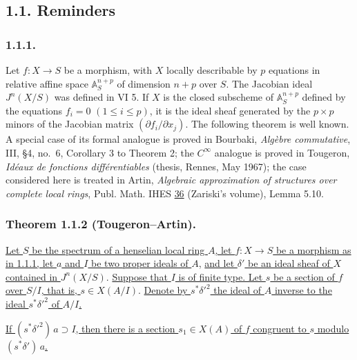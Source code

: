 \subsection*{1.1. Reminders}

\subsubsection*{1.1.1.}
Let $f:X\longrightarrow S$ be a morphism, with $X$ locally
describable by $p$ equations in relative affine space
$\mathbb A_S^{n+p}$ of dimension $n+p$ over $S$.  The Jacobian ideal
$J^n(X/S)$ was defined in VI 5.  If $X$ is the closed subscheme of
$\mathbb A_S^{n+p}$ defined by the equations
$f_i=0$ $(1\leq i\leq p)$, it is the ideal sheaf generated by the
$p\times p$ minors of the Jacobian matrix
$(\partial f_i/\partial x_j)$.  The following theorem is well known.
A special case of its formal analogue is proved in Bourbaki,
\emph{Alg\`ebre commutative}, III, \S4, no.~6, Corollary 3 to
Theorem 2; the $C^\infty$ analogue is proved in Tougeron,
\emph{Id\'eaux de fonctions diff\'erentiables} (thesis, Rennes,
May 1967); the case considered here is treated in Artin,
\emph{Algebraic approximation of structures over complete local
rings}, Publ. Math. IHES \underline{36} (Zariski's volume),
Lemma 5.10.

\subsubsection*{Theorem 1.1.2 (Tougeron--Artin).}
\underline{Let $S$ be the spectrum of a henselian local ring $A$,
let $f:X\to S$ be a morphism as in 1.1.1, let $a$ and $I$ be two
proper ideals of $A$}, \underline{and let $\delta'$ be an ideal sheaf of $X$
contained in $J^n(X/S)$}.  \underline{Suppose that $I$ is of finite type.  Let
$s$ be a section of $f$ over $S/I$, that is, $s\in X(A/I)$}.  \underline{Denote
by $s^*\delta'^2$ the ideal of $A$ inverse to the ideal
$s^*\delta'^2$ of $A/I$.}

\underline{If $(s^*\delta'^2)\,a\supset I$, then there is a section
$s_1\in X(A)$ of $f$ congruent to $s$ modulo
$(s^*\delta')\,a$.}


